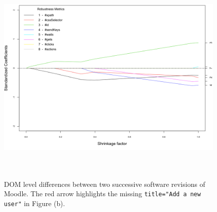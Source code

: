\begin{figure}[ht!] 
\centering     %
{\label{rob:amo}\includegraphics[width=13cm,height=10cm]{./Figures/moodlelasso}}
  \captionsetup{justification=justified,
singlelinecheck=false}
\caption{DOM level differences between two successive software revisions of Moodle. The red arrow highlights the missing \texttt{title="Add a new user"} in Figure (b). }
\label{fig:lasso1}
\end{figure} 


